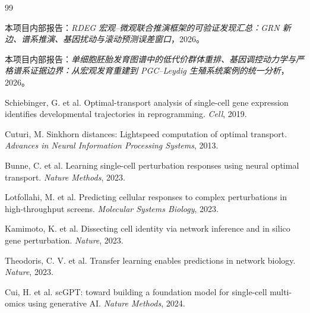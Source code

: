 \documentclass[UTF8,12pt]{ctexart}
\begin{document}
\begin{thebibliography}{99}

本项目内部报告：\textit{RDEG 宏观--微观联合推演框架的可验证发现汇总：GRN 新边、谱系推演、基因扰动与滚动预测误差窗口}，2026。

本项目内部报告：\textit{单细胞胚胎发育图谱中的低代价群体重排、基因调控动力学与严格谱系证据边界：从宏观发育重建到 PGC--Leydig 生殖系统案例的统一分析}，2026。

Schiebinger, G. et al.
Optimal-transport analysis of single-cell gene expression identifies developmental trajectories in reprogramming.
\textit{Cell}, 2019.

Cuturi, M.
Sinkhorn distances: Lightspeed computation of optimal transport.
\textit{Advances in Neural Information Processing Systems}, 2013.

Bunne, C. et al.
Learning single-cell perturbation responses using neural optimal transport.
\textit{Nature Methods}, 2023.

Lotfollahi, M. et al.
Predicting cellular responses to complex perturbations in high-throughput screens.
\textit{Molecular Systems Biology}, 2023.

Kamimoto, K. et al.
Dissecting cell identity via network inference and in silico gene perturbation.
\textit{Nature}, 2023.

Theodoris, C. V. et al.
Transfer learning enables predictions in network biology.
\textit{Nature}, 2023.

Cui, H. et al.
scGPT: toward building a foundation model for single-cell multi-omics using generative AI.
\textit{Nature Methods}, 2024.

\end{thebibliography}
\end{document}
